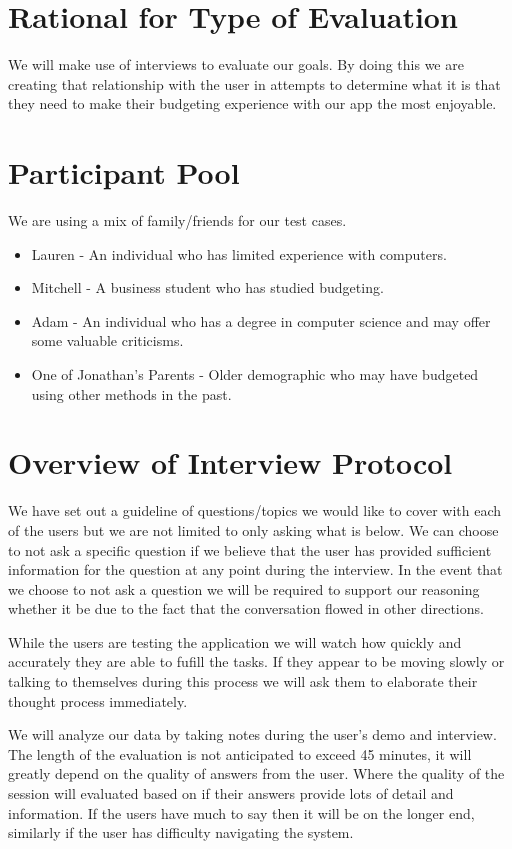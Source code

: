 \documentclass{chi2011}
\begin{document}
\section{Rational for Type of Evaluation}
We will make use of interviews to evaluate our goals. By doing this we are creating that 
relationship with the user in attempts to determine what it is that they need to make their 
budgeting experience with our app the most enjoyable. 

\section{Participant Pool}
We are using a mix of family/friends for our test cases. 
\begin{itemize}
	\item Lauren - An individual who has limited experience with computers. 
	\item Mitchell - A business student who has studied budgeting. 
	\item Adam - An individual who has a degree in computer science and may offer some valuable criticisms. 
	\item One of Jonathan's Parents - Older demographic who may have budgeted using other methods in the past.
\end{itemize}

\section{Overview of Interview Protocol}
We have set out a guideline of questions/topics we would like to cover with each of the users but 
we are not limited to only asking what is below. We can choose to not ask a specific question if we
believe that the user has provided sufficient information for the question at any point during the
interview. In the event that we choose to not ask a question we will be required to support our 
reasoning whether it be due to the fact that the conversation flowed in other directions.

While the users are testing the application we will watch how quickly and accurately they are able to fufill the 
tasks. If they appear to be moving slowly or talking to themselves during this process we will ask them
to elaborate their thought process immediately.

We will analyze our data by taking notes during the user's demo and interview. 
The length of the evaluation is not anticipated to exceed 45 minutes, it will greatly depend on the
quality of answers from the user. Where the quality of the session will evaluated based on if their
answers provide lots of detail and information. If the users have much to say then it will be on 
the longer end, similarly if the user has difficulty navigating the system. 
\end{document}
